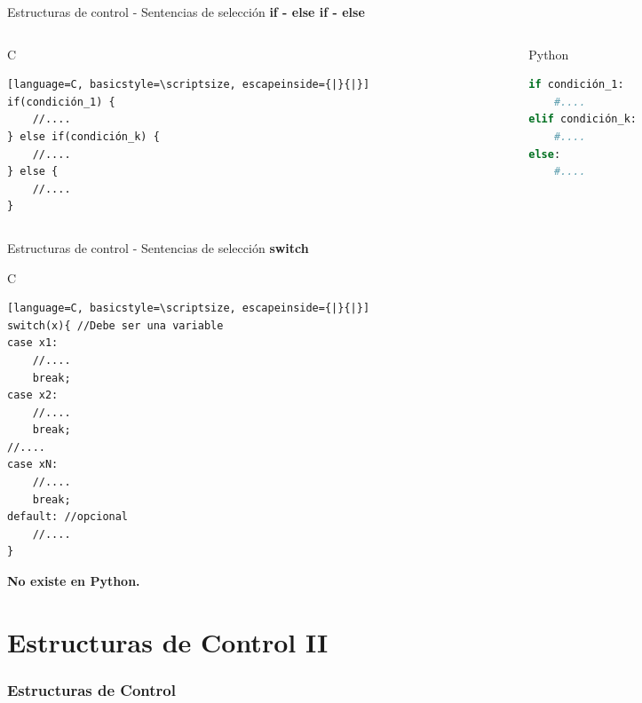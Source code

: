 \documentclass{beamer}
\begin{document}
\begin{frame}[fragile]{Estructuras de control - Sentencias de selección}
\textbf{if - else if - else}
\begin{columns}[t]
	\begin{column}{5cm}
	\begin{exampleblock}{C}
	\begin{lstlisting}[language=C, basicstyle=\scriptsize, escapeinside={|}{|}] 
if(condición_1) {
    //....
} else if(condición_k) {
    //....
} else {
    //....
}
		\end{lstlisting}\end{exampleblock}
	\end{column}
	\begin{column}{5cm}
		\begin{block}{Python}
		\begin{lstlisting}[language=Python, basicstyle=\scriptsize]
if condición_1:
    #....
elif condición_k:
    #....
else:
    #....
		\end{lstlisting}\end{block}
	\end{column}
\end{columns}
\end{frame}

\begin{frame}[fragile]{Estructuras de control - Sentencias de selección}
\textbf{switch}\\
\begin{exampleblock}{C}
\begin{lstlisting}[language=C, basicstyle=\scriptsize, escapeinside={|}{|}] 
switch(x){ //Debe ser una variable
case x1:                                     
	//.... 
	break; 
case x2: 
	//.... 
	break; 
//.... 
case xN: 
	//.... 
	break;  
default: //opcional
	//....
} 
\end{lstlisting}\end{exampleblock}
\bigskip
\textbf{No existe en Python.}
\end{frame}

\part{Estructuras de Control II}
\section{Estructuras de Control}
\end{document}
